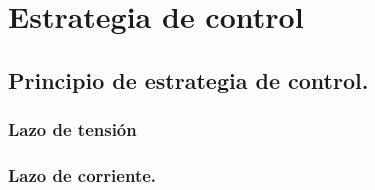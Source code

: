 \chapter{Estrategia de control}

\label{C:Formas de control}

\section{Principio de estrategia de control.}


\subsection{Lazo de tensión}

\subsection{Lazo de corriente.}